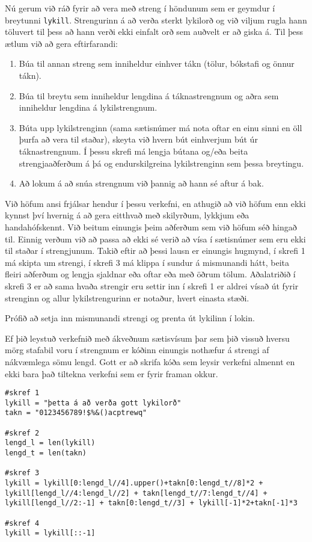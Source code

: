 \begin{exercise}\label{str8}
Nú gerum við ráð fyrir að vera með streng í höndunum sem er geymdur í breytunni \texttt{lykill}.
Strengurinn á að verða sterkt lykilorð og við viljum rugla hann töluvert til þess að hann verði ekki einfalt orð sem auðvelt er að giska á.
Til þess ætlum við að gera eftirfarandi:
\begin{enumerate}
	\item Búa til annan streng sem inniheldur einhver tákn (tölur, bókstafi og önnur tákn).
	\item Búa til breytu sem inniheldur lengdina á táknastrengnum og aðra sem inniheldur lengdina á lykilstrengnum.
	\item Búta upp lykilstrenginn (sama sætisnúmer má nota oftar en einu sinni en öll þurfa að vera til staðar), skeyta við hvern bút einhverjum bút úr táknastrengnum.
		Í þessu skrefi má lengja bútana og/eða beita strengjaaðferðum á þá og endurskilgreina lykilstrenginn sem þessa breytingu.
	\item Að lokum á að snúa strengnum við þannig að hann sé aftur á bak.
\end{enumerate}
\end{exercise}
\begin{Answer}[ref={str8}]
Við höfum ansi frjálsar hendur í þessu verkefni, en athugið að við höfum enn ekki kynnst því hvernig á að gera eitthvað með skilyrðum, lykkjum eða handahófskennt.
Við beitum einungis þeim aðferðum sem við höfum séð hingað til.
Einnig verðum við að passa að ekki sé verið að vísa í sætisnúmer sem eru ekki til staðar í strengjunum.
Takið eftir að þessi lausn er einungis hugmynd, í skrefi 1 má skipta um strengi, í skrefi 3 má klippa í sundur á mismunandi hátt, beita fleiri aðferðum og lengja sjaldnar eða oftar eða með öðrum tölum.
Aðalatriðið í skrefi 3 er að sama hvaða strengir eru settir inn í skrefi 1 er aldrei vísað út fyrir strenginn og allur lykilstrengurinn er notaður, hvert einasta stæði.

Prófið að setja inn mismunandi strengi og prenta út lykilinn í lokin.

Ef þið leystuð verkefnið með ákveðnum sætisvísum þar sem þið vissuð hversu mörg stafabil voru í strengnum er kóðinn einungis nothæfur á strengi af nákvæmlega sömu lengd.
Gott er að skrifa kóða sem leysir verkefni almennt en ekki bara það tiltekna verkefni sem er fyrir framan okkur.
\begin{lstlisting}
#skref 1
lykill = "þetta á að verða gott lykilorð"
takn = "0123456789!$%&()acptrewq" 

#skref 2 
lengd_l = len(lykill)
lengd_t = len(takn)

#skref 3
lykill = lykill[0:lengd_l//4].upper()+takn[0:lengd_t//8]*2 + lykill[lengd_l//4:lengd_l//2] + takn[lengd_t//7:lengd_t//4] + lykill[lengd_l//2:-1] + takn[0:lengd_t//3] + lykill[-1]*2+takn[-1]*3 

#skref 4
lykill = lykill[::-1]\end{lstlisting}
\newpage
\end{Answer}
